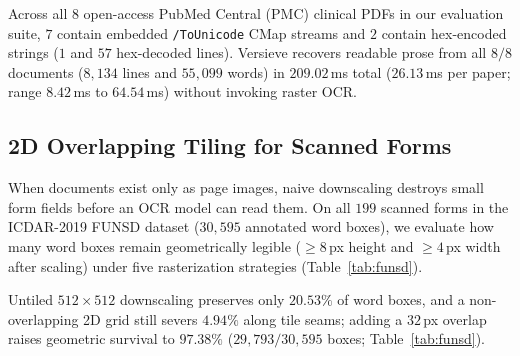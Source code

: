 \documentclass{article}
\begin{document}
Across all $8$ open-access PubMed Central (PMC) clinical PDFs in our evaluation suite, $7$ contain embedded \texttt{/ToUnicode} CMap streams and $2$ contain hex-encoded strings ($1$ and $57$ hex-decoded lines). Versieve recovers readable prose from all $8/8$ documents ($8{,}134$ lines and $55{,}099$ words) in $209.02$\,ms total ($26.13$\,ms per paper; range $8.42$\,ms to $64.54$\,ms) without invoking raster OCR.

\subsection{2D Overlapping Tiling for Scanned Forms}
When documents exist only as page images, naive downscaling destroys small form fields before an OCR model can read them. On all $199$ scanned forms in the ICDAR-2019 FUNSD dataset \citep{jaume2019funsd} ($30{,}595$ annotated word boxes), we evaluate how many word boxes remain geometrically legible ($\ge 8$\,px height and $\ge 4$\,px width after scaling) under five rasterization strategies (Table~\ref{tab:funsd}).

\begin{table}[t]
\caption{Geometric word-box survival on $199$ ICDAR-2019 FUNSD forms ($30{,}595$ boxes; legibility threshold $\ge 8{\times}4$\,px).}
\label{tab:funsd}
\vskip 0.08in
\begin{center}
\end{center}
\vskip -0.14in
\end{table}

Untiled $512{\times}512$ downscaling preserves only $20.53\%$ of word boxes, and a non-overlapping 2D grid still severs $4.94\%$ along tile seams; adding a $32$\,px overlap raises geometric survival to $97.38\%$ ($29{,}793 / 30{,}595$ boxes; Table~\ref{tab:funsd}).
\end{document}
